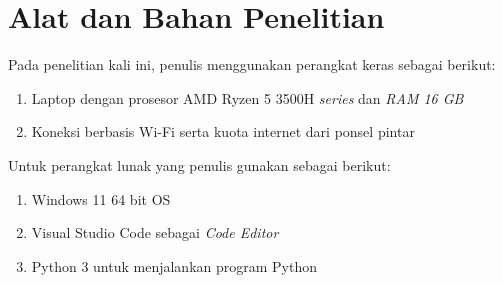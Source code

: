 

\pagebreak
\section{Alat dan Bahan Penelitian}
Pada penelitian kali ini, penulis menggunakan perangkat keras sebagai berikut:
\begin{enumerate}
    \item Laptop dengan prosesor AMD Ryzen 5 3500H \emph{series} dan \emph{RAM 16 GB}
    \item Koneksi berbasis Wi-Fi serta kuota internet dari ponsel pintar
    \end{enumerate}
Untuk perangkat lunak yang penulis gunakan sebagai berikut:
\begin{enumerate}
    \item Windows 11 64 bit OS
    \item Visual Studio Code sebagai \emph{Code Editor}
    \item Python 3 untuk menjalankan program Python
    \end{enumerate}

